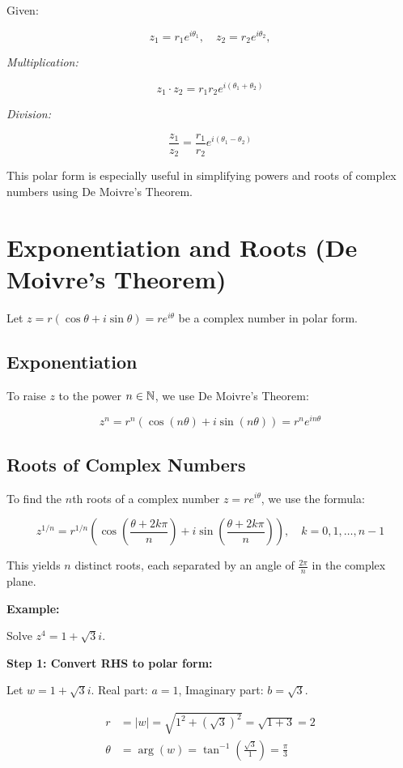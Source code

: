 Given:

\[
	z_1 = r_1 e^{i\theta_1}, \quad z_2 = r_2 e^{i\theta_2},
\]

\emph{Multiplication:}

\[
	z_1 \cdot z_2 = r_1 r_2 e^{i(\theta_1 + \theta_2)}
\]

\emph{Division:}
	      
\[
	\frac{z_1}{z_2} = \frac{r_1}{r_2} e^{i(\theta_1 - \theta_2)}
\]

This polar form is especially useful in simplifying powers and roots of complex numbers using De 
Moivre’s Theorem.

\section{Exponentiation and Roots (De Moivre’s Theorem)}

Let \( z = r(\cos \theta + i \sin \theta) = re^{i\theta} \) be a complex number in polar form.

\subsection*{Exponentiation}

To raise \(z\) to the power \( n \in \mathbb{N} \), we use De Moivre’s Theorem:

\[
	z^n = r^n (\cos(n\theta) + i \sin(n\theta)) = r^n e^{in\theta}
\]

\subsection*{Roots of Complex Numbers}

To find the \(n\)th roots of a complex number \( z = r e^{i\theta} \), we use the formula:

\[
	z^{1/n} = r^{1/n} \left( \cos\left( \frac{\theta + 2k\pi}{n} \right) + i \sin\left( \frac{\theta + 
	2k\pi}{n} \right) \right), \quad k = 0, 1, \ldots, n-1
\]

This yields \(n\) distinct roots, each separated by an angle of \( \frac{2\pi}{n} \) in 
the complex plane.

\textbf{Example:} 

Solve \( z^4 = 1 + \sqrt{3}i \).

\textbf{Step 1: Convert RHS to polar form:}

Let \( w = 1 + \sqrt{3}i \). Real part: \( a = 1 \), Imaginary part: \( b = \sqrt{3} \).

\begin{align*}
	r      & = |w| = \sqrt{1^2 + {(\sqrt{3})}^2} = \sqrt{1 + 3} = 2                    \\
	\theta & = \arg(w) = \tan^{-1} \left( \frac{\sqrt{3}}{1} \right) = \frac{\pi}{3}
\end{align*}

